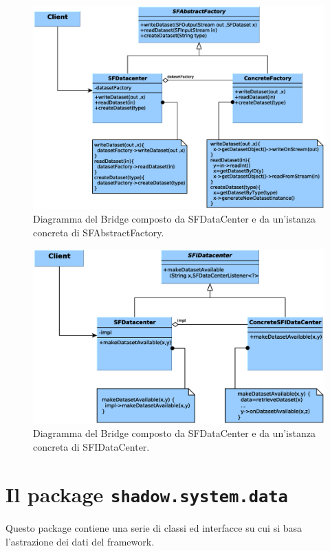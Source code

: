 \begin{figure}
\begin{center}
\includegraphics[width=\textwidth]{Immagini/DataCenterfactory}
\caption[Bridge composto da SFDataCenter e SFAbstractFactory.]{Diagramma del Bridge composto da SFDataCenter e da un'istanza concreta di SFAbstractFactory.\label{f:datacenterfactory}} 
\end{center} 
\end{figure}
\begin{figure}
\begin{center}
\includegraphics[width=\textwidth]{Immagini/DataCenter}
\caption[Bridge composto da SFDataCenter e SFIDataCenter.]{Diagramma del Bridge composto da SFDataCenter e da un'istanza concreta di SFIDataCenter.\label{f:datacenterimplementation}} 
\end{center} 
\end{figure}

\section{Il package \texttt{shadow.system.data}}
\label{sec:shadow_system_data}
Questo package contiene una serie di classi ed interfacce su cui si basa l'astrazione dei dati del framework.

